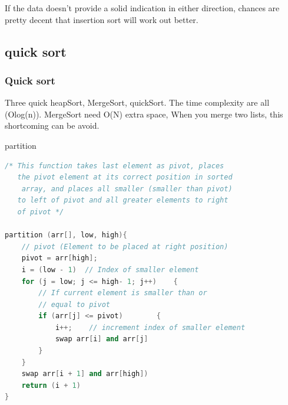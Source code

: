 \documentclass[a4paper,11pt,twoside]{book}
\begin{document}
\par If the data doesn't provide a solid indication in either direction, chances are pretty decent that insertion sort will work out better.

\subsection{quick sort}

\subsubsection{Quick sort}

	\par Three quick heapSort, MergeSort, quickSort. The time complexity are all (Olog(n)). MergeSort need O(N) extra space, When you merge two lists, this shortcoming can be avoid.

	\par partition 
\begin{lstlisting}[frame=single, language=c++]
/* This function takes last element as pivot, places
   the pivot element at its correct position in sorted
    array, and places all smaller (smaller than pivot)
   to left of pivot and all greater elements to right
   of pivot */
   
partition (arr[], low, high){
    // pivot (Element to be placed at right position)
    pivot = arr[high];   
    i = (low - 1)  // Index of smaller element
    for (j = low; j <= high- 1; j++)    {
        // If current element is smaller than or
        // equal to pivot
        if (arr[j] <= pivot)        {
            i++;    // increment index of smaller element
            swap arr[i] and arr[j]
        }
    }
    swap arr[i + 1] and arr[high])
    return (i + 1)
}
\end{lstlisting}
\end{document}
